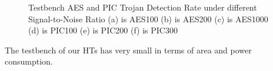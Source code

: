 \documentclass{beamer}
\begin{document}
\begin{columns}
\begin{column}[T]{0.33\textwidth}
\begin{figure}[h]
\begin{columns}
                    \end{columns}
                    \label{fig:snr}
                    \caption{
                        {\color{black}Testbench AES and PIC Trojan Detection Rate under different
                    Signal-to-Noise Ratio
                    (a) is AES100
                    (b) is AES200
                    (c) is AES1000
                    (d) is PIC100
                    (e) is PIC200
                    (f) is PIC300}
                    }
                    \vspace{-0.15in}
                \end{figure}
            The testbench of our HTs has very small in terms of area and power
            consumption.


\end{column}
\end{columns}
\end{document}
